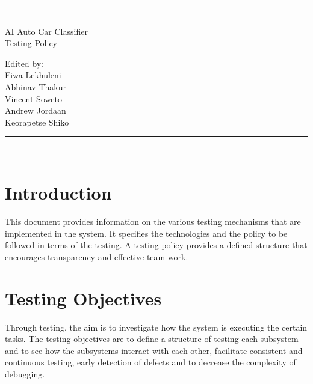 \documentclass[10pt]{article}
\begin{document}
	
	\begin{titlepage}
		\centering
		\vspace*{\fill}
		
		\vspace*{0.5cm}
		
		\huge\bfseries
		\rule{\textwidth}{1.6pt}\\[\baselineskip]
		AI Auto Car Classifier \\Testing Policy
		
		\vspace*{0.5cm}
		
		\large Edited by: \\[\baselineskip]
		
		{Fiwa Lekhuleni\\Abhinav Thakur\\Vincent Soweto\\Andrew Jordaan\\Keorapetse Shiko}
		
		\rule{\textwidth}{1.6pt}\\[\baselineskip]
		
		
		\vspace*{\fill}
	\end{titlepage}
	
	\newpage
	
	\tableofcontents
	
	
	\newpage
	
\section{Introduction}

\hspace{5cm}

This document provides information on the various testing mechanisms that are implemented in the system. It specifies the technologies and the policy to be followed in terms of the testing. A testing policy provides a defined structure that encourages transparency and effective team work. 

\hspace{5cm}


\section{Testing Objectives}

\hspace{5cm}

Through testing, the aim is to investigate how the system is executing the certain tasks. The testing objectives are to define a structure of testing each subsystem and to see how the subsystems interact with each other, facilitate consistent and continuous testing, early detection of defects and to decrease the complexity of debugging.
\end{document}
